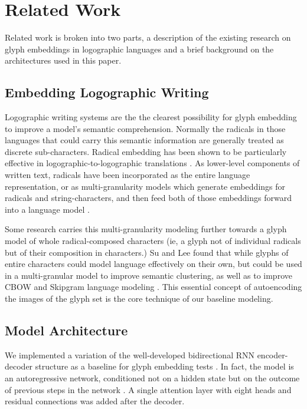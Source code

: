 \documentclass{article}
\begin{document}
\section{Related Work}


\label{sec:related works}

 Related work is broken into two parts, a description of the existing research on glyph embeddings in logographic languages and a brief background on the architectures used in this paper.

\subsection{Embedding Logographic Writing}
\label{sec:Logographic radicals}
Logographic writing systems are the the clearest possibility for glyph embedding to improve a model's semantic comprehension. Normally the radicals in those languages that could carry this semantic information are generally treated as discrete sub-characters. Radical embedding has been shown to be particularly effective in logographic-to-logographic translations \cite{jpcn2017glyph}. As lower-level components of written text, radicals have been incorporated as the entire language representation, or as multi-granularity models which generate embeddings for radicals and string-characters, and then feed both of those embeddings forward into a language model \cite{shi2015, yinmultigran2016}. 

Some research carries this multi-granularity modeling further towards a glyph model of whole radical-composed characters (ie, a glyph not of individual radicals but of their composition in characters.) Su and Lee found that while glyphs of entire characters could model language effectively on their own, but could be used in a multi-granular model to improve semantic clustering, as well as to improve CBOW and Skipgram language modeling \cite{su2017}. This essential concept of autoencoding the images of the glyph set is the core technique of our baseline modeling.

\subsection{Model Architecture}
\label{sec:Model architecture}
We implemented a variation of the well-developed bidirectional RNN encoder-decoder structure as a baseline for glyph embedding tests \cite{bidirectionalrnn}. In fact, the model is an autoregressive network, conditioned not on a hidden state but on the outcome of previous steps in the network \cite{autoregression}. A single attention layer with eight heads and residual connections was added after the decoder. 
\end{document}
